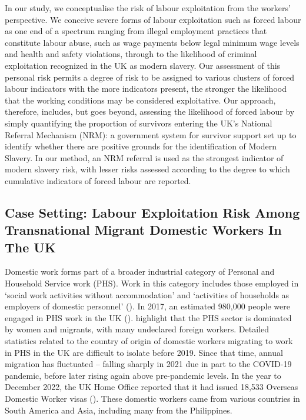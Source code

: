 \documentclass[
  12pt,
  letterpaper,
  DIV=11,
  numbers=noendperiod]{scrartcl}
\theoremstyle{plain}
\theoremstyle{definition}
\begin{document}
In our study, we conceptualise the risk of labour exploitation from the
workers' perspective. We conceive severe forms of labour exploitation
such as forced labour as one end of a spectrum ranging from illegal
employment practices that constitute labour abuse, such as wage payments
below legal minimum wage levels and health and safety violations,
through to the likelihood of criminal exploitation recognized in the UK
as modern slavery. Our assessment of this personal risk permits a degree
of risk to be assigned to various clusters of forced labour indicators
with the more indicators present, the stronger the likelihood that the
working conditions may be considered exploitative. Our approach,
therefore, includes, but goes beyond, assessing the likelihood of forced
labour by simply quantifying the proportion of survivors entering the
UK's National Referral Mechanism (NRM): a government system for survivor
support set up to identify whether there are positive grounds for the
identification of Modern Slavery. In our method, an NRM referral is used
as the strongest indicator of modern slavery risk, with lesser risks
assessed according to the degree to which cumulative indicators of
forced labour are reported.

\subsection{Case Setting: Labour Exploitation Risk Among Transnational
Migrant Domestic Workers In The
UK}\label{case-setting-labour-exploitation-risk-among-transnational-migrant-domestic-workers-in-the-uk}

Domestic work forms part of a broader industrial category of Personal
and Household Service work (PHS). Work in this category includes those
employed in `social work activities without accommodation' and
`activities of households as employers of domestic personnel'
(\textcite{european_commission_staff_2012}). In 2017, an estimated
980,000 people were engaged in PHS work in the UK
(\textcite{manoudi_analysis_2018}). \textcite{manoudi_analysis_2018}
highlight that the PHS sector is dominated by women and migrants, with
many undeclared foreign workers. Detailed statistics related to the
country of origin of domestic workers migrating to work in PHS in the UK
are difficult to isolate before 2019. Since that time, annual migration
has fluctuated -- falling sharply in 2021 due in part to the COVID-19
pandemic, before later rising again above pre-pandemic levels. In the
year to December 2022, the UK Home Office reported that it had issued
18,533 Overseas Domestic Worker visas (\textcite{home_office_why_2023}).
These domestic workers came from various countries in South America and
Asia, including many from the Philippines.
\end{document}

